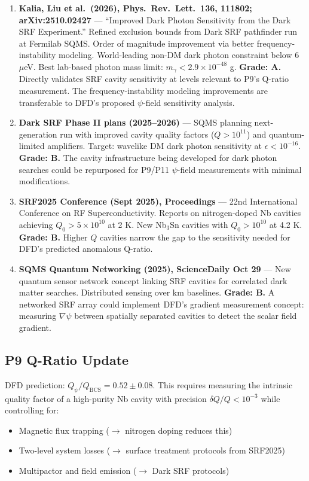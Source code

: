 \documentclass[11pt,a4paper]{article}
\begin{document}
\begin{enumerate}

\item \textbf{Kalia, Liu et al.\ (2026), Phys.\ Rev.\ Lett.\ 136, 111802; arXiv:2510.02427} --- ``Improved Dark Photon Sensitivity from the Dark SRF Experiment.'' Refined exclusion bounds from Dark SRF pathfinder run at Fermilab SQMS. Order of magnitude improvement via better frequency-instability modeling. World-leading non-DM dark photon constraint below 6 $\mu$eV. Best lab-based photon mass limit: $m_\gamma < 2.9\times10^{-48}$ g. \textbf{Grade: A.} Directly validates SRF cavity sensitivity at levels relevant to P9's Q-ratio measurement. The frequency-instability modeling improvements are transferable to DFD's proposed $\psi$-field sensitivity analysis.

\item \textbf{Dark SRF Phase II plans (2025--2026)} --- SQMS planning next-generation run with improved cavity quality factors ($Q > 10^{11}$) and quantum-limited amplifiers. Target: wavelike DM dark photon sensitivity at $\epsilon < 10^{-16}$. \textbf{Grade: B.} The cavity infrastructure being developed for dark photon searches could be repurposed for P9/P11 $\psi$-field measurements with minimal modifications.

\item \textbf{SRF2025 Conference (Sept 2025), Proceedings} --- 22nd International Conference on RF Superconductivity. Reports on nitrogen-doped Nb cavities achieving $Q_0 > 5\times10^{10}$ at 2 K. New Nb$_3$Sn cavities with $Q_0 > 10^{10}$ at 4.2 K. \textbf{Grade: B.} Higher $Q$ cavities narrow the gap to the sensitivity needed for DFD's predicted anomalous Q-ratio.

\item \textbf{SQMS Quantum Networking (2025), ScienceDaily Oct 29} --- New quantum sensor network concept linking SRF cavities for correlated dark matter searches. Distributed sensing over km baselines. \textbf{Grade: B.} A networked SRF array could implement DFD's gradient measurement concept: measuring $\nabla\psi$ between spatially separated cavities to detect the scalar field gradient.

\end{enumerate}

\subsection{P9 Q-Ratio Update}

DFD prediction: $Q_\psi/Q_\mathrm{BCS} = 0.52 \pm 0.08$. This requires measuring the intrinsic quality factor of a high-purity Nb cavity with precision $\delta Q/Q < 10^{-3}$ while controlling for:
\begin{itemize}
\item Magnetic flux trapping ($\to$ nitrogen doping reduces this)
\item Two-level system losses ($\to$ surface treatment protocols from SRF2025)
\item Multipactor and field emission ($\to$ Dark SRF protocols)
\end{itemize}
\end{document}
